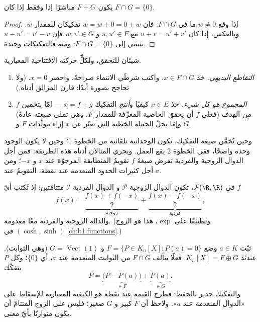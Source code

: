 \begin{proposition}\label{prop:b1:vspaces:directsum}
يكون $F + G$ مباشرًا إذا وفقط إذا كان $F \cap G = \{0\}$.
\end{proposition}

\begin{proof}
إذا وقع $w \neq 0$ ما في $F \cap G$: فإن $w = w + 0 = 0 + w$ تفكيكان
للمقدار $w$. وبالعكس، إذا كان $u + v = u' + v'$ مع $u, u'
\in F$ و $v, v' \in G$، فإن $u - u' = v' - v$ ينتمي إلى $F \cap G =
\{0\}$: ومنه فالتفكيكات وحيدة.
\end{proof}

\begin{method}[البرهان على $E = F \oplus G$]
\label{met:b1:vspaces:directsum}
شيئان للتحقق، ولكلٍّ حركته الافتتاحية المعيارية.
\begin{enumerate}
  \item \emph{التقاطع البديهي.} خذ $x \in F \cap G$،
        واكتب شرطَي الانتماء صراحةً، واحصر $x =
        0$. (ولا تحاجج بصورة أبدًا: قارن المزالق أدناه.)
  \item \emph{المجموع هو كل شيء.} خذ $x \in E$ كيفيًا
        و\emph{أنتج} التفكيك $x = f + g$ ---
        إمّا بتخمين $f$ من الهدف (فعلى $f$ أن يحقق
        الخاصية المعرِّفة للمقدار $F$، وهي تملي صيغته
        عادةً) وإمّا بحلّ الجملة الخطية التي تعبّر عن $x$
        إزاء مولّدات $F$ و $G$.
\end{enumerate}
وحين تُخمَّن صيغة التفكيك، تكون الوحدانية
تلقائية من الخطوة 1؛ وحين لا يكون الوجود وحده واضحًا، ففي الخطوة 2
يقع العمل. ويجري المثالان أدناه هذه الطريقة: فمن أجل
الدوال الزوجية والفردية تفرض صيغةَ $f$ تقويمُ المتطابقة المرجوّة
عند $x$ و $-x$؛ ومن أجل كثيرات الحدود المنعدمة عند نقطة، التقويمُ عند $a$.
\end{method}

\begin{example}\label{ex:b1:vspaces:evenodd}
في $\mathcal{F}(\R, \R)$، تكون الدوال الزوجية $\mathcal{P}$ و
الدوال الفردية $\mathcal{I}$ متتامّتين: إذ تُكتب أيّ $f$
\[
f(x) = \underbrace{\frac{f(x) + f(-x)}{2}}_{\text{زوجية}}
+ \underbrace{\frac{f(x) - f(-x)}{2}}_{\text{فردية}},
\]
والدالة الزوجية والفردية معًا معدومة. (وتطبيقًا على $\exp$، هذا هو
الزوج $(\cosh, \sinh)$ في \cref{ch:b1:functions}.)
\end{example}

\begin{example}
\label{ex:b1:vspaces:hyperplane}
ثبّت $a \in K$ وضع $F = \{P \in K_n[X] : P(a) = 0\}$ و $G =
\operatorname{Vect}(1)$ (وهي الثوابت). عندئذ $K_n[X] = F \oplus
G$. فعلًا يتألف $F \cap G$ من الثوابت المنعدمة عند $a$،
أي $\{0\}$؛ وكل $P$ يتفكّك
\[
P = \underbrace{\bigl(P - P(a)\bigr)}_{\in F}
+ \underbrace{P(a)}_{\in G} .
\]
والتفكيك جدير بالحفظ: فطرح القيمة عند
نقطة هو الكيفية المعيارية للإسقاط على «الدوال المنعدمة عند
$a$». ولاحظ أن $F$  كبير و $G$ صغير؛ فليس على
الزوج المتتامّ أن يكون متوازنًا بأيّ معنى.
\end{example}

